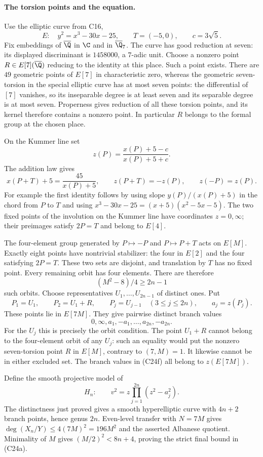 \paragraph{The torsion points and the equation.}
Use the elliptic curve from C16,
\[
 E:\quad y^2=x^3-30x-25,
 \qquad T=(-5,0),\qquad c=3\sqrt5.
\]
Fix embeddings of $\overline\Q$ in $\C$ and in
$\overline\Q_7$. The curve has good reduction at seven:
its displayed discriminant is $1458000$, a $7$-adic unit.
Choose a nonzero point $R\in E[7](\overline\Q)$ reducing
to the identity at this place. Such a point exists. There are
$49$ geometric points of $E[7]$ in characteristic zero,
whereas the geometric seven-torsion in the special elliptic
curve has at most seven points: the differential of $[7]$
vanishes, so its inseparable degree is at least seven and
its separable degree is at most seven. Properness gives
reduction of all these torsion points, and its kernel therefore
contains a nonzero point. In particular $R$ belongs to the
formal group at the chosen place.

On the Kummer line set
\[
 z(P)=\frac{x(P)+5-c}{x(P)+5+c}.
 \tag{C24c}
\]
The addition law gives
\[
 x(P+T)+5=\frac{45}{x(P)+5},\qquad
 z(P+T)=-z(P),\qquad z(-P)=z(P).
 \tag{C24d}
\]
For example the first identity follows by using slope
$y(P)/(x(P)+5)$ in the chord from $P$ to $T$ and using
$x^3-30x-25=(x+5)(x^2-5x-5)$. The two fixed points
of the involution on the Kummer line have coordinates $z=0,\infty$;
their preimages satisfy $2P=T$ and belong to $E[4]$.

The four-element group generated by $P\mapsto-P$ and
$P\mapsto P+T$ acts on $E[M]$. Exactly eight points have
nontrivial stabilizer: the four in $E[2]$ and the four satisfying
$2P=T$. These two sets are disjoint, and translation by $T$
has no fixed point. Every remaining orbit has four elements.
There are therefore
\[
 (M^2-8)/4\geq2n-1
\]
such orbits. Choose representatives $U_1,\ldots,U_{2n-1}$
of distinct ones. Put
\[
 P_1=U_1,\qquad P_2=U_1+R,\qquad
 P_j=U_{j-1}\quad(3\leq j\leq2n),\qquad a_j=z(P_j).
 \tag{C24e}
\]
These points lie in $E[7M]$. They give pairwise distinct
branch values
\[
 0,\infty, a_1,-a_1,\ldots,a_{2n},-a_{2n}.
 \tag{C24f}
\]
For the $U_j$ this is precisely the orbit condition.
The point $U_1+R$ cannot belong to the four-element orbit
of any $U_j$: such an equality would put the nonzero
seven-torsion point $R$ in $E[M]$, contrary to $(7,M)=1$.
It likewise cannot be in either excluded set. The branch
values in (C24f) all belong to $z(E[7M])$.

Define the smooth projective model of
\[
 H_n:\qquad v^2=z\prod_{j=1}^{2n}(z^2-a_j^2).
 \tag{C24g}
\]
The distinctness just proved gives a smooth hyperelliptic curve
with $4n+2$ branch points, hence genus $2n$.
Even-level transfer with $N=7M$ gives
$\deg(X_n/Y)\leq4(7M)^2=196M^2$ and the asserted
Albanese quotient. Minimality of $M$ gives
$(M/2)^2<8n+4$, proving the strict final bound in (C24a).

